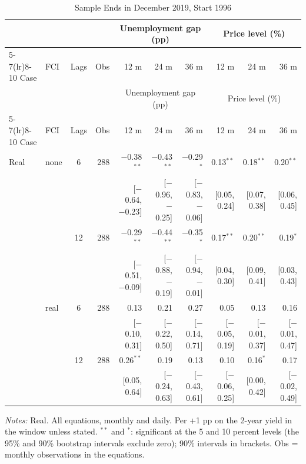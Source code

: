 \begingroup\scriptsize\setlength{\tabcolsep}{0.9pt}
\begin{longtable}{llcrrrrrrr}
\caption{Sample Ends in December 2019, Start 1996}\label{tab:appA1}\\
\toprule
 & & & & \multicolumn{3}{c}{Unemployment gap (pp)} & \multicolumn{3}{c}{Price level (\%)}\\ \cmidrule(lr){5-7}\cmidrule(lr){8-10}
Case & FCI & Lags & Obs & 12 m & 24 m & 36 m & 12 m & 24 m & 36 m\\
\midrule\endfirsthead
\toprule
 & & & & \multicolumn{3}{c}{Unemployment gap (pp)} & \multicolumn{3}{c}{Price level (\%)}\\ \cmidrule(lr){5-7}\cmidrule(lr){8-10}
Case & FCI & Lags & Obs & 12 m & 24 m & 36 m & 12 m & 24 m & 36 m\\
\midrule\endhead
\bottomrule\endfoot
Real & none & 6 & 288 & $-$0.38$^{**}$ & $-$0.43$^{**}$ & $-$0.29$^{*}$ & 0.13$^{**}$ & 0.18$^{**}$ & 0.20$^{**}$\\
 & & & & {\scriptsize [$-$0.64, $-$0.23]} & {\scriptsize [$-$0.96, $-$0.25]} & {\scriptsize [$-$0.83, $-$0.06]} & {\scriptsize [0.05, 0.24]} & {\scriptsize [0.07, 0.38]} & {\scriptsize [0.06, 0.45]}\\
 &  & 12 & 288 & $-$0.29$^{**}$ & $-$0.44$^{**}$ & $-$0.35$^{*}$ & 0.17$^{**}$ & 0.20$^{**}$ & 0.19$^{*}$\\
 & & & & {\scriptsize [$-$0.51, $-$0.09]} & {\scriptsize [$-$0.88, $-$0.19]} & {\scriptsize [$-$0.94, $-$0.01]} & {\scriptsize [0.04, 0.30]} & {\scriptsize [0.09, 0.41]} & {\scriptsize [0.03, 0.43]}\\
 & real & 6 & 288 & 0.13 & 0.21 & 0.27 & 0.05 & 0.13 & 0.16\\
 & & & & {\scriptsize [$-$0.10, 0.31]} & {\scriptsize [$-$0.22, 0.50]} & {\scriptsize [$-$0.14, 0.71]} & {\scriptsize [$-$0.05, 0.19]} & {\scriptsize [$-$0.01, 0.37]} & {\scriptsize [$-$0.01, 0.47]}\\
 &  & 12 & 288 & 0.26$^{**}$ & 0.19 & 0.13 & 0.10 & 0.16$^{*}$ & 0.17\\
 & & & & {\scriptsize [0.05, 0.64]} & {\scriptsize [$-$0.24, 0.63]} & {\scriptsize [$-$0.43, 0.61]} & {\scriptsize [$-$0.06, 0.25]} & {\scriptsize [0.00, 0.42]} & {\scriptsize [$-$0.02, 0.49]}\\
\end{longtable}
\begin{flushleft}\footnotesize\textit{Notes:} Real. All equations, monthly and daily. Per +1 pp on the 2-year yield in the window unless stated. $^{**}$ and $^{*}$: significant at the 5 and 10 percent levels (the 95\% and 90\% bootstrap intervals exclude zero); 90\% intervals in brackets. Obs = monthly observations in the equations.\end{flushleft}
\endgroup
